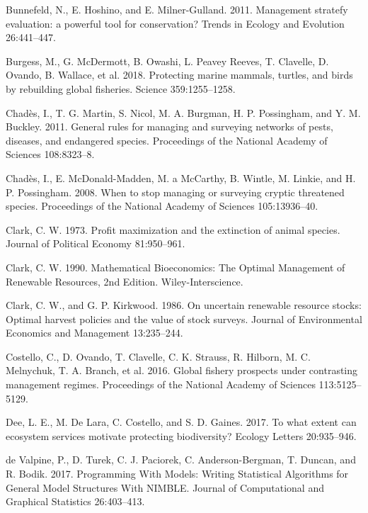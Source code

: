 \documentclass[3p]{elsarticle} %
\begin{document}
\leavevmode\hypertarget{ref-Bunnefeld2011}{}%
Bunnefeld, N., E. Hoshino, and E. Milner-Gulland. 2011. Management
stratefy evaluation: a powerful tool for conservation? Trends in Ecology
and Evolution 26:441--447.

\leavevmode\hypertarget{ref-Burgess2018}{}%
Burgess, M., G. McDermott, B. Owashi, L. Peavey Reeves, T. Clavelle, D.
Ovando, B. Wallace, et al. 2018. Protecting marine mammals, turtles, and
birds by rebuilding global fisheries. Science 359:1255--1258.

\leavevmode\hypertarget{ref-Chades2011}{}%
Chadès, I., T. G. Martin, S. Nicol, M. A. Burgman, H. P. Possingham, and
Y. M. Buckley. 2011. General rules for managing and surveying networks
of pests, diseases, and endangered species. Proceedings of the National
Academy of Sciences 108:8323--8.

\leavevmode\hypertarget{ref-Chades2008}{}%
Chadès, I., E. McDonald-Madden, M. a McCarthy, B. Wintle, M. Linkie, and
H. P. Possingham. 2008. When to stop managing or surveying cryptic
threatened species. Proceedings of the National Academy of Sciences
105:13936--40.

\leavevmode\hypertarget{ref-Clark1973}{}%
Clark, C. W. 1973. Profit maximization and the extinction of animal
species. Journal of Political Economy 81:950--961.

\leavevmode\hypertarget{ref-Clark1990}{}%
Clark, C. W. 1990. Mathematical Bioeconomics: The Optimal Management of
Renewable Resources, 2nd Edition. Wiley-Interscience.

\leavevmode\hypertarget{ref-Clark1986}{}%
Clark, C. W., and G. P. Kirkwood. 1986. On uncertain renewable resource
stocks: Optimal harvest policies and the value of stock surveys. Journal
of Environmental Economics and Management 13:235--244.

\leavevmode\hypertarget{ref-Costello2016}{}%
Costello, C., D. Ovando, T. Clavelle, C. K. Strauss, R. Hilborn, M. C.
Melnychuk, T. A. Branch, et al. 2016. Global fishery prospects under
contrasting management regimes. Proceedings of the National Academy of
Sciences 113:5125--5129.

\leavevmode\hypertarget{ref-Dee2017}{}%
Dee, L. E., M. De Lara, C. Costello, and S. D. Gaines. 2017. To what
extent can ecosystem services motivate protecting biodiversity? Ecology
Letters 20:935--946.

\leavevmode\hypertarget{ref-nimble}{}%
de Valpine, P., D. Turek, C. J. Paciorek, C. Anderson-Bergman, T.
Duncan, and R. Bodik. 2017. Programming With Models: Writing Statistical
Algorithms for General Model Structures With NIMBLE. Journal of
Computational and Graphical Statistics 26:403--413.
\end{document}

